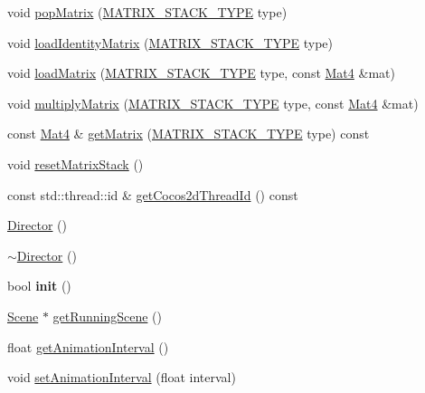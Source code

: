 \begin{DoxyCompactItemize}
\item 
void \hyperlink{classDirector_a4c47574ac63626fa0e14eee27fed8b99}{pop\+Matrix} (\hyperlink{group__base_ga4d146cef7130a8f3a953d46964ea3905}{M\+A\+T\+R\+I\+X\+\_\+\+S\+T\+A\+C\+K\+\_\+\+T\+Y\+PE} type)
\item 
void \hyperlink{classDirector_a3491e578d2d80809b44892144bd6645a}{load\+Identity\+Matrix} (\hyperlink{group__base_ga4d146cef7130a8f3a953d46964ea3905}{M\+A\+T\+R\+I\+X\+\_\+\+S\+T\+A\+C\+K\+\_\+\+T\+Y\+PE} type)
\item 
void \hyperlink{classDirector_a95ecc03e54db47241c59ad68c4eb9ec2}{load\+Matrix} (\hyperlink{group__base_ga4d146cef7130a8f3a953d46964ea3905}{M\+A\+T\+R\+I\+X\+\_\+\+S\+T\+A\+C\+K\+\_\+\+T\+Y\+PE} type, const \hyperlink{classMat4}{Mat4} \&mat)
\item 
void \hyperlink{classDirector_aec8693e208a9eeb95de9b4c6af300444}{multiply\+Matrix} (\hyperlink{group__base_ga4d146cef7130a8f3a953d46964ea3905}{M\+A\+T\+R\+I\+X\+\_\+\+S\+T\+A\+C\+K\+\_\+\+T\+Y\+PE} type, const \hyperlink{classMat4}{Mat4} \&mat)
\item 
const \hyperlink{classMat4}{Mat4} \& \hyperlink{classDirector_a4e361548a1bec142a29b4a5e1148fe60}{get\+Matrix} (\hyperlink{group__base_ga4d146cef7130a8f3a953d46964ea3905}{M\+A\+T\+R\+I\+X\+\_\+\+S\+T\+A\+C\+K\+\_\+\+T\+Y\+PE} type) const
\item 
void \hyperlink{classDirector_a1227205af91f2bc56f25fb9c5f0439bd}{reset\+Matrix\+Stack} ()
\item 
const std\+::thread\+::id \& \hyperlink{classDirector_a582225969ce1f42224c0387779f875e1}{get\+Cocos2d\+Thread\+Id} () const
\item 
\hyperlink{classDirector_a607a41fe5c42dd9ca7e256a11942a6d7}{Director} ()
\item 
\hyperlink{classDirector_a59d7a588bfd4edd22948a9e7fd8c854a}{$\sim$\+Director} ()
\item 
\mbox{\label{classDirector_aa0c98effd0ca901b5f64f62270777891}} 
bool {\bfseries init} ()
\item 
\hyperlink{classScene}{Scene} $\ast$ \hyperlink{classDirector_a674852932c4b153b4e1ff4ee51ac07b8}{get\+Running\+Scene} ()
\item 
float \hyperlink{classDirector_ad69cc0f9296b7e083f1e91b3a84dad94}{get\+Animation\+Interval} ()
\item 
void \hyperlink{classDirector_aa6bb2738f121a6e9076a27c7916c38a5}{set\+Animation\+Interval} (float interval)
\item 

\end{DoxyCompactItemize}
